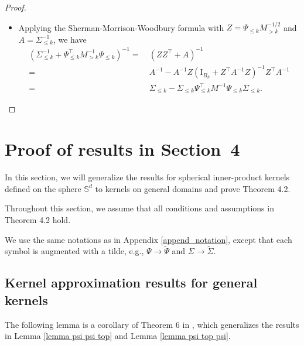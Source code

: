 \documentclass{article}
\theoremstyle{plain}
\theoremstyle{definition}
\theoremstyle{remark}
\begin{document}
\begin{appendix}
\begin{proof}
\begin{itemize}
\item Applying the Sherman-Morrison-Woodbury formula with $Z= \Psi_{\leq k} M_{> k}^{-1/2}$ and $A=\Sigma_{\leq k}^{-1}$, we have
\begin{equation*}
    \begin{aligned}
        \left( \Sigma_{\leq k}^{-1} + \Psi_{\leq k}^{\top} M_{>k}^{-1} \Psi_{\leq k}  \right)^{-1}
        = &~
        (ZZ^{\top} + A)^{-1}\\
        = &~
        A^{-1} - A^{-1} Z(\mathrm{I}_{B_{k}} + Z^{\top} A^{-1} Z)^{-1} Z^{\top} A^{-1}\\
        = &~
        \Sigma_{\leq k} - \Sigma_{\leq k} \Psi^{\top}_{\leq k} M^{-1} \Psi_{\leq k}\Sigma_{\leq k}.
    \end{aligned}
\end{equation*}
\end{itemize}
\end{proof}





\section{Proof of results 
in Section~4
}\label{append_kernel_app_general}

In this section, we will generalize the results for spherical inner-product kernels defined on the sphere $\mathbb{S}^{d}$ to kernels on general domains and prove Theorem 4.2.

Throughout this section, we assume that all conditions and assumptions in Theorem 4.2 hold.

We use the same notations as in Appendix \ref{append_notation}, except that each symbol is augmented with a tilde, e.g., $\Psi \to \tilde{\Psi}$ and $\Sigma \to \tilde{\Sigma}$.



\subsection{Kernel approximation results for general kernels }

The following lemma is a corollary of Theorem 6 in \cite{mei2022generalization}, which generalizes the results in Lemma \ref{lemma psi psi top} and Lemma \ref{lemma psi top psi}.


\end{appendix}
\end{document}
